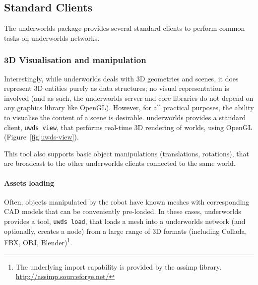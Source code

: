 \documentclass[letterpaper, 10pt, conference]{ieeeconf}
\newcommand{\eg}{e.g.,\xspace}
\newcommand{\uwds}{{\sc underworlds}\xspace}
\begin{document}
\subsection{Standard Clients}
\label{std_clients}

The \uwds package provides several standard clients to perform common tasks on
\uwds networks.

\subsubsection{3D Visualisation and manipulation}

Interestingly, while \uwds deals with 3D geometries and scenes, it does
represent 3D entities purely as data structures; no visual representation is
involved (and as such, the \uwds server and core libraries do not depend on any
graphics library like OpenGL). However, for all practical purposes, the ability
to visualise the content of a scene is desirable. \uwds provides a standard
client, {\tt uwds view}, that performs real-time 3D rendering of worlds,
using OpenGL (Figure~\ref{fig|uwds-view}).

This tool also supports basic object manipulations (translations, rotations),
that are broadcast to the other \uwds clients connected to the same world.

\paragraph*{Assets loading}


Often, objects manipulated by the robot have known meshes with corresponding CAD
models that can be conveniently pre-loaded. In these cases, \uwds provides a
tool, {\tt uwds load}, that loads a mesh into a \uwds network (and optionally,
creates a node) from a large range of 3D formats (including Collada, FBX, OBJ,
Blender)\footnote{The underlying import
capability is provided by the {\sc assimp} library.
\url{http://assimp.sourceforge.net/}}.
\end{document}
